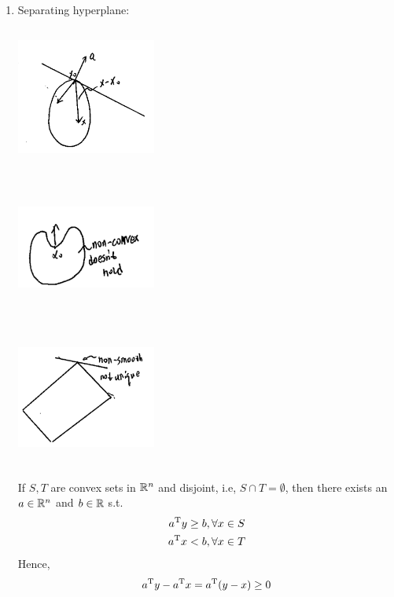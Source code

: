 \begin{enumerate}
	\item Separating hyperplane: 
	\begin{marginfigure}
		\centering
		\includegraphics[width=1.8in,height=1.8in]{figures/ch08/figure1030_3.png}
	\end{marginfigure}
	
	\begin{marginfigure}
		\centering
		\includegraphics[width=1.8in,height=1.8in]{figures/ch08/figure1030_4.png}
	\end{marginfigure}
	
	\begin{marginfigure}
		\centering
		\includegraphics[width=1.8in,height=1.8in]{figures/ch08/figure1030_5.png}
	\end{marginfigure}
	If $S,T$ are convex sets in $\mathbb{R}^n$ and disjoint, i.e, $S\cap T = \emptyset$, then there exists an $a \in \mathbb{R}^n$ and $b\in \mathbb{R}$ s.t.	
	\begin{align*}
	a^{{\rm T}}y&\geq b, \forall x\in S\\
	a^{{\rm T}}x &<b, \forall x\in T                              
	\end{align*}
	Hence,
	 $$a^{{\rm T}}y - a^{{\rm T}} x = a^{{\rm T}}(y-x) \geq 0$$
	


\end{enumerate}
